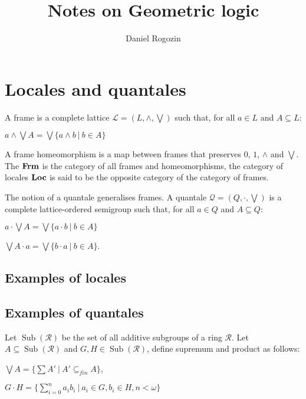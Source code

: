 \documentclass[a4paper]{article}
\author{Daniel Rogozin}
\date{}
\title{Notes on Geometric logic}
\theoremstyle{defin}
\theoremstyle{theorem}
\theoremstyle{claim}
\theoremstyle{prop}
\theoremstyle{lemma}
\theoremstyle{fact}
\theoremstyle{ex}
\theoremstyle{col}
\begin{document}
\maketitle

\tableofcontents

\newpage

\nocite{*}

\section{Locales and quantales}

A frame is a complete lattice $\mathcal{L} = (L, \wedge, \bigvee)$ such that, for all $a \in L$ and $A \subseteq L$:
\begin{center}
$a \wedge \bigvee A = \bigvee \{ a \wedge b \: | \: b \in A \}$
\end{center}
A frame homeomorphism is a map between frames that preserves $0$, $1$, $\wedge$ and $\bigvee$. The ${\bf Frm}$ is the category of all frames and homeomorphisms, the category of locales ${\bf Loc}$ is said to be the opposite category of the category of frames.

The notion of a quantale generalises frames. A quantale $\mathcal{Q} = (Q, \cdot, \bigvee)$ is a complete lattice-ordered semigroup such that, for all $a \in Q$ and $A \subseteq Q$:
\begin{center}
$a \cdot \bigvee A = \bigvee \{ a \cdot b \: | \: b \in A \}$

$\bigvee A \cdot a = \bigvee \{ b \cdot a \: | \: b \in A \}$.
\end{center}

\subsection{Examples of locales}

\subsection{Examples of quantales}

Let $\operatorname{Sub}(\mathcal{R})$ be the set of all additive subgroups of a ring $\mathcal{R}$. Let $A \subseteq \operatorname{Sub}(\mathcal{R})$ and $G, H \in \operatorname{Sub}(\mathcal{R})$, define supremum and product as follows:
\begin{center}
$\bigvee A = \{ \sum A' \: | \: A' \subseteq_{fin} A \}$,

$G \cdot H = \{ \sum \limits_{i = 0}^n a_i b_i \: | \: a_i \in G, b_i \in H, n < \omega \}$
\end{center}
\end{document}
